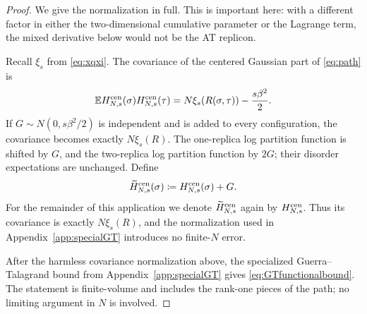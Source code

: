 \documentclass[11pt]{article}
\numberwithin{equation}{section}
\newcommand{\E}{\mathbb{E}}
\newcommand{\1}{\mathbf 1}
\begin{document}
\begin{proof}
We give the normalization in full.  This is important here: with a
different factor in either the two-dimensional cumulative parameter
or the Lagrange term, the mixed derivative below would not be the AT
replicon.

Recall $\xi_s$ from \eqref{eq:xqxi}.
The covariance of the centered Gaussian part of \eqref{eq:path} is
\begin{equation}
 \E H_{N,s}^{\rm cen}(\sigma)H_{N,s}^{\rm cen}(\tau)
 =N\xi_s(R(\sigma,\tau))-\frac{s\beta^2}{2}.
 \label{eq:GTcovariance}
\end{equation}
If $G\sim N(0,s\beta^2/2)$ is independent and is added to every
configuration, the covariance becomes exactly $N\xi_s(R)$.  The
one-replica log partition function is shifted by $G$, and the
two-replica log partition function by $2G$; their disorder
expectations are unchanged.  Define
\[
 \widetilde H_{N,s}^{\rm cen}(\sigma)
 \coloneqq H_{N,s}^{\rm cen}(\sigma)+G.
\]
For the remainder of this application we denote
$\widetilde H_{N,s}^{\rm cen}$ again by $H_{N,s}^{\rm cen}$.  Thus its
covariance is exactly $N\xi_s(R)$, and the normalization used in
Appendix~\ref{app:specialGT} introduces no finite-$N$ error.

After the harmless covariance normalization above, the specialized
Guerra--Talagrand bound from Appendix~\ref{app:specialGT} gives
\eqref{eq:GTfunctionalbound}.
The statement is finite-volume and includes the rank-one pieces of the
path; no limiting argument in $N$ is involved.


\end{proof}
\end{document}
